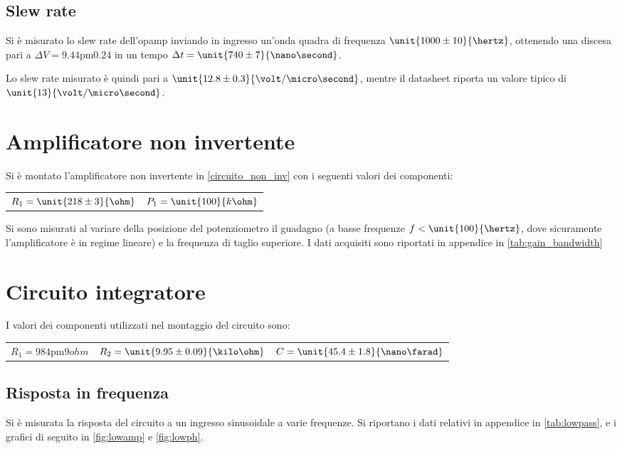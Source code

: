 \documentclass[10pt,a4paper]{article}
\begin{document}
\subsection{Slew rate}
Si è misurato lo slew rate dell'opamp inviando in ingresso un'onda quadra di frequenza $\unit{1000 \pm 10}{\hertz}$, ottenendo una discesa pari a  $\Delta V = \unit{9.44 \pm 0.24}$ in un tempo $\Delta t = \unit{740 \pm 7}{\nano\second}$.

Lo slew rate misurato è quindi pari a $\unit{12.8 \pm 0.3}{\volt/\micro\second}$, mentre il datasheet riporta un valore tipico di $\unit{13}{\volt/\micro\second}$.


\section{Amplificatore non invertente}
Si è montato l'amplificatore non invertente in \figurename{\ref{circuito_non_inv}} con i seguenti valori dei componenti:

\begin{table}[h!]
	\centering
	\begin{tabular}{cc}
		$R_1 = \unit{218 \pm 3}{\ohm}$  & $P_1 = \unit{100}{k\ohm}$
	\end{tabular}
\end{table}

Si sono misurati al variare della posizione del potenziometro il guadagno (a basse frequenze $f < \unit{100}{\hertz}$, dove sicuramente l'amplificatore è in regime lineare) e la frequenza di taglio superiore. I dati acquisiti sono riportati in appendice in \tablename{\ref{tab:gain_bandwidth}}

\section{Circuito integratore}

I valori dei componenti utilizzati nel montaggio del circuito sono:

\begin{table}[h!]
\centering
\begin{tabular}{ccc}
$R_1 = \unit{984 \pm 9}{ohm}$	&	$R_2 = \unit{9.95 \pm 0.09}{\kilo\ohm}$	&	$C = \unit{45.4 \pm 1.8}{\nano\farad}$
\end{tabular}
\end{table}

\subsection{Risposta in frequenza}
Si è misurata la risposta del circuito a un ingresso sinusoidale a varie frequenze. Si riportano i dati relativi in appendice in \tablename{\ref{tab:lowpass}}, e i grafici di seguito in \figurename{\ref{fig:lowamp}} e \figurename{\ref{fig:lowph}}.
\end{document}
